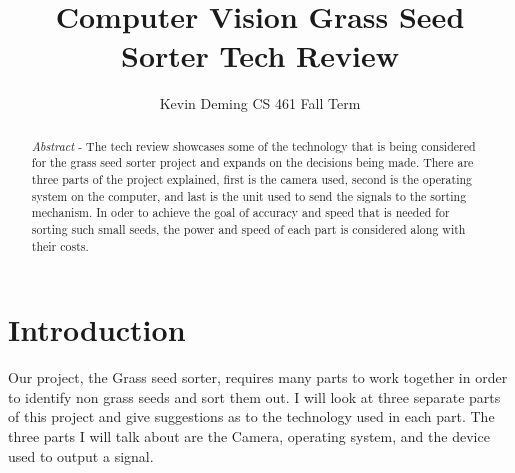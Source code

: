 \documentclass[10pt, letterpaper, twoside, draftclsnofoot, onecolumn. notitlepage]{article}
\title{Computer Vision Grass Seed Sorter Tech Review}
\author{Kevin Deming
CS 461 Fall Term}
\begin{document}
	
	\begin{titlepage}
		\maketitle
		\begin{abstract}
			\textit{Abstract} - The tech review showcases some of the technology that is being considered for the grass seed sorter project and expands on the decisions being made. There are three parts of the project explained, first is the camera used, second is the operating system on the computer, and last is the unit used to send the signals to the sorting mechanism. In oder to achieve the goal of accuracy and speed that is needed for sorting such small seeds, the power and speed of each part is considered along with their costs.
		\end{abstract}
	\end{titlepage}
\section{Introduction}
\quad Our project, the Grass seed sorter, requires many parts to work together in order to identify non grass seeds and sort them out. I will look at three separate parts of this project and give suggestions as to the technology used in each part. The three parts I will talk about are the Camera, operating system, and the device used to output a signal.
\end{document}
